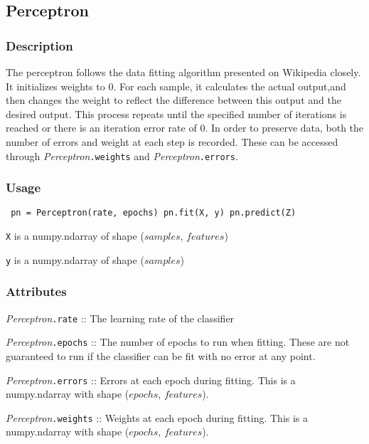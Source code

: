 \documentclass{article}
\begin{document}
\subsection{Perceptron}

\subsubsection{Description}

The perceptron follows the data fitting algorithm presented on Wikipedia
closely. It initializes weights to 0. For each sample, it calculates the actual
output,and then changes the weight to reflect the difference between this output
and the desired output. This process repeats until the specified number of
iterations is reached or there is an iteration error rate of 0. In order to
preserve data, both the number of errors and weight at each step is recorded.
These can be accessed through \textit{Perceptron}\texttt{.weights} and
\textit{Perceptron}\texttt{.errors}.

\subsubsection{Usage}

\begin{verbatim} pn = Perceptron(rate, epochs) pn.fit(X, y) pn.predict(Z)
\end{verbatim}

\texttt{X} is a numpy.ndarray of shape ($samples$, $features$)

\texttt{y} is a numpy.ndarray of shape ($samples$)

\subsubsection{Attributes}

\textit{Perceptron}\texttt{.rate} :: The learning rate of the classifier

\textit{Perceptron}\texttt{.epochs} :: The number of epochs to run when fitting.
These are not guaranteed to run if the classifier can be fit with no error at
any point.

\textit{Perceptron}\texttt{.errors} :: Errors at each epoch during fitting. This
is a numpy.ndarray with shape ($epochs$, $features$).

\textit{Perceptron}\texttt{.weights} :: Weights at each epoch during fitting.
This is a numpy.ndarray with shape ($epochs$, $features$).
\end{document}
